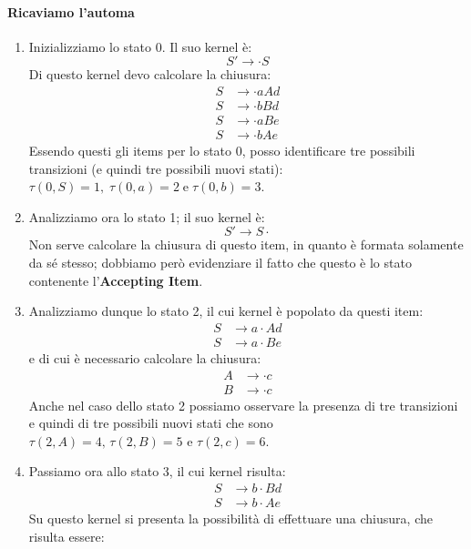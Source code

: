 \documentclass[class=book, crop=false, oneside, 12pt]{standalone}
\begin{document}
\paragraph{Ricaviamo l'automa}
\begin{enumerate}
    \item Inizializziamo lo stato 0. Il suo kernel è:
    \begin{equation*}
        S' \to \cdot S
    \end{equation*}
    Di questo kernel devo calcolare la chiusura:
    \begin{align*}
        S &\to \cdot aAd \\
    	S &\to \cdot bBd \\
    	S &\to \cdot aBe \\
    	S &\to \cdot bAe
    \end{align*}
    Essendo questi gli items per lo stato 0, posso identificare tre possibili transizioni (e quindi tre possibili nuovi stati): \(\tau(0,S)=1, \; \tau(0,a)=2 \; \textrm{e} \; \tau(0,b)=3\).
    \item Analizziamo ora lo stato 1; il suo kernel è:
    \begin{equation*}
        S' \to S \cdot    
    \end{equation*}
    Non serve calcolare la chiusura di questo item, in quanto è formata solamente da sé stesso; dobbiamo però evidenziare il fatto che questo è lo stato contenente l'\textbf{Accepting Item}.
    \item Analizziamo dunque lo stato 2, il cui kernel è popolato da questi item:
    \begin{align*}
        S &\to a \cdot Ad \\
        S &\to a \cdot Be
    \end{align*}
    e di cui è necessario calcolare la chiusura:
    \begin{align*}
        A &\to \cdot c \\
        B &\to \cdot c
    \end{align*}
    Anche nel caso dello stato 2 possiamo osservare la presenza di tre transizioni e quindi di tre possibili nuovi stati che sono \(\tau(2,A)=4 \textrm{, } \tau(2,B)=5 \textrm{ e } \tau(2,c)=6\).
    \item Passiamo ora allo stato 3, il cui kernel risulta:
    \begin{align*}
        S &\to b \cdot Bd \\
        S &\to b \cdot Ae
    \end{align*}
    Su questo kernel si presenta la possibilità di effettuare una chiusura, che risulta essere:

\end{enumerate}
\end{document}
